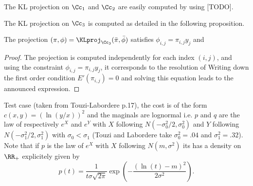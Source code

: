 The KL projection on $\Cc_1$ and $\Cc_2$ are easily computed by using [TODO].

The KL projection on $\Cc_3$ is computed as detailed in the following proposition.

\begin{prop}
	The projection $(\pi,\phi) = \KLproj_{\Cc_3}(\bar\pi,\bar\phi)$ satisfies
	$\phi_{i,j} = \pi_{i,j}y_j$ and
\end{prop} 
\begin{proof}
	The projection is computed independently for each index $(i,j)$, and using the constraint $\phi_{i,j} = \pi_{i,j}y_j$, it corresponds to the resolution of
	Writing down the first order condition $E'(\pi_{i,j})=0$ and solving this equation leads to the announced expression.
\end{proof}


Test case (taken from Touzi-Labordere p.17), the cost is of the form $c(x,y)=(\ln(y/x))^2$ and the maginals are lognormal i.e. $p$ and $q$ are the law of respectively $e^X$ and $e^Y$ with $X$ following $N(-\sigma_0^2/2, \sigma_0^2)$ and $Y$ following $N(-\sigma_1^2/2, \sigma_1^2)$ with $\sigma_0<\sigma_1$ (Touzi and Labordere take $\sigma_0^2=.04$ and $\sigma_1^2=.32$). Note that if $p$ is the law of $e^X$ with $X$ following $N(m, \sigma^2)$ its has a density on $\RR_+$ explicitely given by
\[p(t)=\frac{1}{ t \sigma \sqrt{2\pi}} \exp(-\frac{(\ln(t)-m)^2}{2\sigma^2}).  \]





